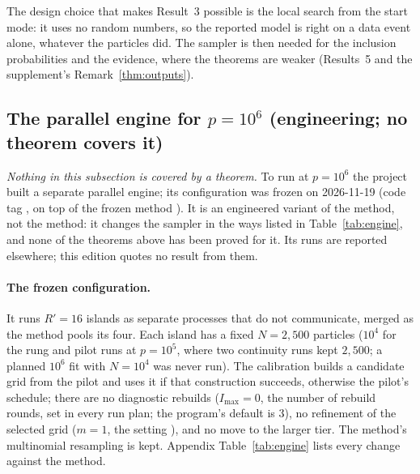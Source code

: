 The design choice that makes Result~3 possible is the local search from the start mode: it uses no random numbers, so the
reported model is right on a data event alone, whatever the particles did. The sampler is then needed for the inclusion
probabilities and the evidence, where the theorems are weaker (Results~5 and the supplement's
Remark~\ref{thm:outputs}).

\subsection{The parallel engine for \texorpdfstring{$p=10^6$}{p=10\^{}6} (engineering; no theorem covers it)}\label{sec:supp-1m}

\emph{Nothing in this subsection is covered by a theorem.} To run at $p=10^6$ the project built a separate parallel engine;
its configuration was frozen on 2026-11-19 (code tag , on top of the frozen method
). It is an engineered variant of the method, not the method: it changes the sampler in the
ways listed in Table~\ref{tab:engine}, and none of the theorems above has been proved for it. Its runs are reported
elsewhere; this edition quotes no result from them.

\paragraph{The frozen configuration.} It runs $R'=16$ islands as separate processes that do not communicate, merged as
the method pools its four. Each island has a fixed $N=2{,}500$ particles ($10^4$ for the rung and pilot runs at $p=10^5$,
where two continuity runs kept $2{,}500$; a planned $10^6$ fit with $N=10^4$ was never run). The calibration builds a
candidate grid from the pilot and uses it if that construction succeeds, otherwise the pilot's schedule; there are no
diagnostic rebuilds ($I_{\max}=0$, the number of rebuild rounds, set in every run plan; the program's default is $3$), no
refinement of the selected grid ($m=1$, the setting ), and no move to the larger tier. The method's multinomial resampling is kept. Appendix
Table~\ref{tab:engine} lists every change against the method.

